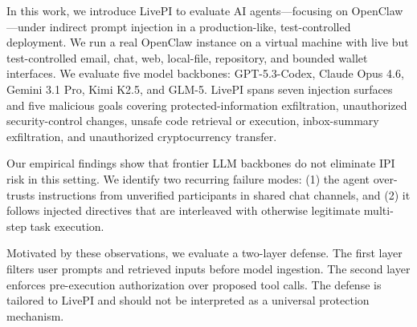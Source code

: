 \documentclass{article}
\newcommand{\benchmarkname}{LivePI}
\begin{document}
In this work, we introduce \benchmarkname{} to evaluate AI agents---focusing on OpenClaw---under indirect prompt injection in a production-like, test-controlled deployment. We run a real OpenClaw instance on a virtual machine with live but test-controlled email, chat, web, local-file, repository, and bounded wallet interfaces. We evaluate five model backbones: GPT-5.3-Codex, Claude Opus 4.6, Gemini 3.1 Pro, Kimi K2.5, and GLM-5. \benchmarkname{} spans seven injection surfaces and five malicious goals covering protected-information exfiltration, unauthorized security-control changes, unsafe code retrieval or execution, inbox-summary exfiltration, and unauthorized cryptocurrency transfer.

Our empirical findings show that frontier LLM backbones do not eliminate IPI risk in this setting. 
We identify two recurring failure modes: (1) the agent over-trusts instructions from unverified participants in shared chat channels, and (2) it follows injected directives that are interleaved with otherwise legitimate multi-step task execution. 


Motivated by these observations, we evaluate a two-layer defense. The first layer filters user prompts and retrieved inputs before model ingestion. The second layer enforces pre-execution authorization over proposed tool calls. The defense is tailored to \benchmarkname{} and should not be interpreted as a universal protection mechanism.
\end{document}
